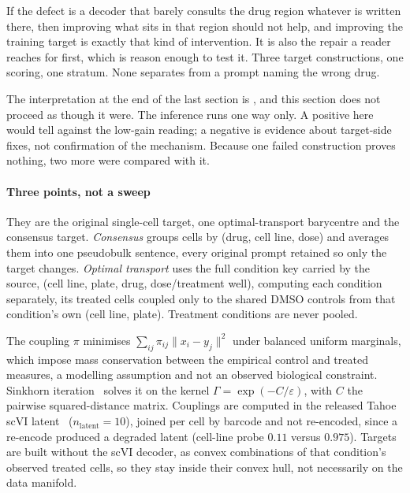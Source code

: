 
\begin{question}[4]
If the defect is a decoder that barely consults the drug region whatever is
written there, then improving what sits in that region should not help, and
improving the training target is exactly that kind of intervention. It is also
the repair a reader reaches for first, which is reason enough to test it. Three
target constructions, one scoring, one stratum. None separates from a prompt
naming the wrong drug.
\end{question}

\noindent
The interpretation at the end of the last section is \notestablished, and this
section does not proceed as though it were. The inference runs one way only. A
positive here would tell against the low-gain reading; a negative is evidence
about target-side fixes, not confirmation of the mechanism. Because one failed
construction proves nothing, two more were compared with it.

\paragraph{Three points, not a sweep} They are the original single-cell target,
one optimal-transport barycentre and the consensus target. \emph{Consensus}
groups cells by (drug, cell line, dose) and averages them into one pseudobulk
sentence, every original prompt retained so only the target changes.
\emph{Optimal transport} uses the full condition key carried by the source,
(cell line, plate, drug, dose/treatment well), computing each condition
separately, its treated cells coupled only to the shared DMSO controls from that
condition's own (cell line, plate). Treatment conditions are never pooled.

The coupling $\pi$ minimises $\sum_{ij}\pi_{ij}\lVert x_i - y_j\rVert^2$ under
balanced uniform marginals, which impose mass conservation between the empirical
control and treated measures, a modelling assumption and not an observed
biological constraint. Sinkhorn iteration~\cite{cuturi} solves it on the kernel
$\Gamma = \exp(-C/\varepsilon)$, with $C$ the pairwise squared-distance matrix.
Couplings are computed in the released Tahoe scVI latent~\cite{scvi}
($n_{\textrm{latent}} = 10$), joined per cell by barcode and not re-encoded,
since a re-encode produced a degraded latent (cell-line probe $0.11$ versus
$0.975$). Targets are built without the scVI decoder, as convex combinations of that
condition's observed treated cells, so they stay inside their convex hull, not
necessarily on the data manifold.

